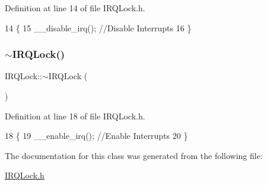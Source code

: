 Definition at line 14 of file I\+R\+Q\+Lock.\+h.


\begin{DoxyCode}
14               \{
15         \_\_disable\_irq(); \textcolor{comment}{//Disable Interrupts}
16         \}
\end{DoxyCode}
\mbox{\label{class_i_r_q_lock_a77ab3c6555d123ef45e2e50e4eab81fb}} 
\subsubsection{\texorpdfstring{$\sim$\+I\+R\+Q\+Lock()}{~IRQLock()}}
{\footnotesize\ttfamily I\+R\+Q\+Lock\+::$\sim$\+I\+R\+Q\+Lock (\begin{DoxyParamCaption}{ }\end{DoxyParamCaption})\hspace{0.3cm}{\ttfamily [inline]}}



Definition at line 18 of file I\+R\+Q\+Lock.\+h.


\begin{DoxyCode}
18                \{
19         \_\_enable\_irq(); \textcolor{comment}{//Enable Interrupts}
20         \}
\end{DoxyCode}


The documentation for this class was generated from the following file\+:\begin{DoxyCompactItemize}
\item 
\hyperlink{_i_r_q_lock_8h}{I\+R\+Q\+Lock.\+h}\end{DoxyCompactItemize}
